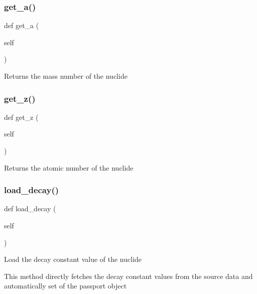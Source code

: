 \subsubsection{\texorpdfstring{get\+\_\+a()}{get\_a()}}
{\footnotesize\ttfamily def get\+\_\+a (\begin{DoxyParamCaption}\item[{}]{self }\end{DoxyParamCaption})}

\begin{DoxyVerb}Returns the mass number of the nuclide\end{DoxyVerb}
 \mbox{\label{classopenbu_1_1passport_1_1_passport_aa75b75b6a9d2a68e6a592e7353044edb}} 
\subsubsection{\texorpdfstring{get\+\_\+z()}{get\_z()}}
{\footnotesize\ttfamily def get\+\_\+z (\begin{DoxyParamCaption}\item[{}]{self }\end{DoxyParamCaption})}

\begin{DoxyVerb}Returns the atomic number of the nuclide\end{DoxyVerb}
 \mbox{\label{classopenbu_1_1passport_1_1_passport_ab6f7c3af79510d2bf012aa1a483a6cf8}} 
\subsubsection{\texorpdfstring{load\+\_\+decay()}{load\_decay()}}
{\footnotesize\ttfamily def load\+\_\+decay (\begin{DoxyParamCaption}\item[{}]{self }\end{DoxyParamCaption})}

\begin{DoxyVerb}Load the decay constant value of the nuclide

This method directly fetches the decay constant values from the source data and automatically set
of the passport object\end{DoxyVerb}
 \mbox{\label{classopenbu_1_1passport_1_1_passport_a3fd9b285c12428f2f1021f6fa498d27b}} 
